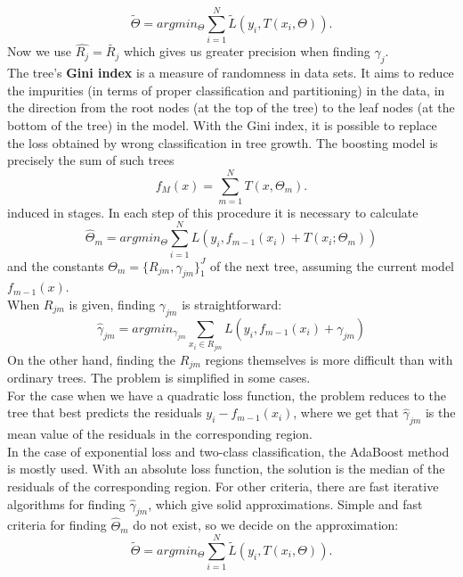 \documentclass[12pt, letterpaper, twoside]{article}
\begin{document}
\begin{equation*}
\tilde{\Theta}=argmin_{\Theta}\sum_{i=1}^N \tilde{L}(y_i,T(x_i,\Theta)).
\end{equation*}
Now we use $\hat{R_j}=\tilde{R_j}$ which gives us greater precision when finding $\gamma_j$.\\
\hspace*{4ex}The tree's \textbf{Gini index} is a measure of randomness in data sets. It aims to reduce the impurities (in terms of proper classification and partitioning) in the data, in the direction from the root nodes (at the top of the tree) to the leaf nodes (at the bottom of the tree) in the model. With the Gini index, it is possible to replace the loss obtained by wrong classification in tree growth. The boosting model is precisely the sum of such trees 
\begin{equation*}
f_M(x)=\sum_{m=1}^N T(x,\Theta_m).
\end{equation*}
induced in stages. In each step of this procedure it is necessary to calculate
\begin{equation*}
\hat{\Theta}_m=argmin_{\Theta}\sum_{i=1}^N L(y_i,f_{m-1}(x_i)+T(x_i;\Theta_m))
\end{equation*}
and the constants $\Theta_m=\{R_{jm},\gamma_{jm}\}_1^J$ of the next tree, assuming the current model $f_{m-1}(x)$.\\
\hspace*{4ex}When $R_{jm}$ is given, finding $\gamma_{jm}$ is straightforward:
\begin{equation*}
\hat{\gamma}_{jm}=argmin_{\gamma_{jm}}\sum_{x_i \in R_{jm}} L(y_i,f_{m-1}(x_i)+\gamma_{jm})
\end{equation*}
On the other hand, finding the $R_{jm}$ regions themselves is more difficult than with ordinary trees. The problem is simplified in some cases.\\
\hspace*{4ex}For the case when we have a quadratic loss function, the problem reduces to the tree that best predicts the residuals $y_i − f_{m−1}(x_i)$, where we get that $\hat{\gamma}_{jm}$ is the mean value of the residuals in the corresponding region.\\
\hspace*{4ex}In the case of exponential loss and two-class classification, the AdaBoost method is mostly used. With an absolute loss function, the solution is the median of the residuals of the corresponding region. For other criteria, there are fast iterative algorithms for finding $\hat{\gamma}_{jm}$, which give solid approximations. Simple and fast criteria for finding $\hat{\Theta}_m$ do not exist, so we decide on the approximation:
\begin{equation*}
\tilde{\Theta}=argmin_{\Theta}\sum_{i=1}^N \tilde{L}(y_i,T(x_i,\Theta)).
\end{equation*}
\end{document}
